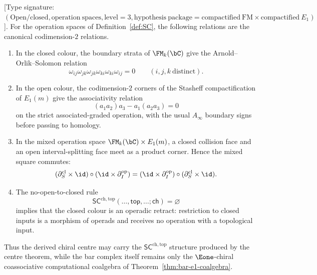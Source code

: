 \begin{proposition}
\label{prop:sc-chtop-boundary-relation-ledger}
\textup{[}Type signature:
$(\mathrm{Open/closed},\mathrm{operation\ spaces},
\mathrm{level}=3,
\mathrm{hypothesis\ package}=\mathrm{compactified\ FM}
\times\mathrm{compactified}\ E_1)$\textup{].}
For the operation spaces of Definition~\ref{def:SC}, the following
relations are the canonical codimension-$2$ relations.
\begin{enumerate}[label=\textup{(\roman*)}]
\item In the closed colour, the boundary strata of
$\FM_k(\bC)$ give the Arnold--Orlik--Solomon relation
\begin{equation}
\label{eq:sc-ledger-arnold}
\omega_{ij}\omega_{jk}
\omega_{jk}\omega_{ki}
\omega_{ki}\omega_{ij}=0
\qquad (i,j,k\ \mathrm{distinct}).
\end{equation}
\item In the open colour, the codimension-$2$ corners of the
Stasheff compactification of $E_1(m)$ give the associativity
relation
\begin{equation}
\label{eq:sc-ledger-stasheff}
(a_1a_2)a_3-a_1(a_2a_3)=0
\end{equation}
on the strict associated-graded operation, with the usual
$A_\infty$ boundary signs before passing to homology.
\item In the mixed operation space
$\FM_k(\bC)\times E_1(m)$, a closed collision face and an open
interval-splitting face meet as a product corner.  Hence the mixed
square commutes:
\begin{equation}
\label{eq:sc-ledger-mixed-square}
(\partial^{\mathrm{cl}}_S\times\id)\circ
(\id\times\partial^{\mathrm{op}}_I)
=
(\id\times\partial^{\mathrm{op}}_I)\circ
(\partial^{\mathrm{cl}}_S\times\id).
\end{equation}
\item The no-open-to-closed rule
\begin{equation}
\label{eq:sc-ledger-no-open-to-closed}
\mathsf{SC}^{\mathrm{ch,top}}
(\ldots,\mathsf{top},\ldots;\mathsf{ch})=\varnothing
\end{equation}
implies that the closed colour is an operadic retract:
restriction to closed inputs is a morphism of operads and receives no
operation with a topological input.
\end{enumerate}
Thus the derived chiral centre may carry the
$\mathsf{SC}^{\mathrm{ch,top}}$ structure produced by the centre
theorem, while the bar complex itself remains only the
$\Eone$-chiral coassociative computational coalgebra of
Theorem~\ref{thm:bar-e1-coalgebra}.
\end{proposition}

